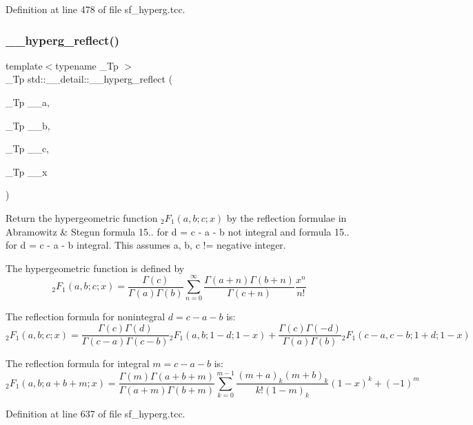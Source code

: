 Definition at line 478 of file sf\+\_\+hyperg.\+tcc.

\mbox{\label{namespacestd_1_1____detail_a3c3baddc93bfaf1cb368d4b74e53542d}} 
\subsubsection{\texorpdfstring{\+\_\+\+\_\+hyperg\+\_\+reflect()}{\_\_hyperg\_reflect()}}
{\footnotesize\ttfamily template$<$typename \+\_\+\+Tp $>$ \\
\+\_\+\+Tp std\+::\+\_\+\+\_\+detail\+::\+\_\+\+\_\+hyperg\+\_\+reflect (\begin{DoxyParamCaption}\item[{\+\_\+\+Tp}]{\+\_\+\+\_\+a,  }\item[{\+\_\+\+Tp}]{\+\_\+\+\_\+b,  }\item[{\+\_\+\+Tp}]{\+\_\+\+\_\+c,  }\item[{\+\_\+\+Tp}]{\+\_\+\+\_\+x }\end{DoxyParamCaption})}



Return the hypergeometric function $ {}_2F_1(a,b;c;x) $ by the reflection formulae in Abramowitz \& Stegun formula 15.. for d = c -\/ a -\/ b not integral and formula 15.. for d = c -\/ a -\/ b integral. This assumes a, b, c != negative integer. 

The hypergeometric function is defined by \[ {}_2F_1(a,b;c;x) = \frac{\Gamma(c)}{\Gamma(a)\Gamma(b)} \sum_{n=0}^{\infty} \frac{\Gamma(a+n)\Gamma(b+n)}{\Gamma(c+n)} \frac{x^n}{n!} \]

The reflection formula for nonintegral $ d = c - a - b $ is\+: \[ {}_2F_1(a,b;c;x) = \frac{\Gamma(c)\Gamma(d)}{\Gamma(c-a)\Gamma(c-b)} {}_2F_1(a,b;1-d;1-x) + \frac{\Gamma(c)\Gamma(-d)}{\Gamma(a)\Gamma(b)} {}_2F_1(c-a,c-b;1+d;1-x) \]

The reflection formula for integral $ m = c - a - b $ is\+: \[ {}_2F_1(a,b;a+b+m;x) = \frac{\Gamma(m)\Gamma(a+b+m)}{\Gamma(a+m)\Gamma(b+m)} \sum_{k=0}^{m-1} \frac{(m+a)_k(m+b)_k}{k!(1-m)_k} (1 - x)^k + (-1)^m \] 

Definition at line 637 of file sf\+\_\+hyperg.\+tcc.



